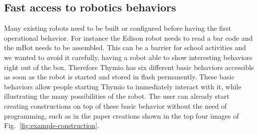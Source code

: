 \documentclass[letterpaper, 10 pt, conference]{ieeeconf}  %
\begin{document}
\subsection{Fast access to robotics behaviors}
\label{sec:behaviors}

Many existing robots need to be built or configured before having the first operational behavior. 
For instance the Edison robot needs to read a bar code and the mBot needs to be assembled.
This can be a barrier for school activities and we wanted to avoid it carefully, having a robot able to show interesting behaviors right out of the box.
Therefore Thymio has six different basic behaviors accessible as soon as the robot is started and stored in flash permanently.
These basic behaviors allow people starting Thymio to immediately interact with it, while illustrating the many possibilities of the robot.
The user can already start creating constructions on top of these basic behavior without the need of programming, such as in the paper creations shown in the top four images of Fig.~\ref{fig:example-construction}.

\end{document}
